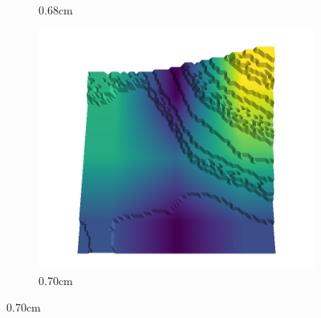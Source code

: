 \begin{figure}[H]
\begin{subfigure}[b]{0.192\linewidth}
    \caption{0.68cm}
    \label{fig : quarry-best-18}
    \end{subfigure}
    \begin{subfigure}[b]{0.192\linewidth}
    \includegraphics[width=\linewidth]{../img/5/quarry/best/70-patch-3d-majavi-colormap-190.png}
    \caption{0.70cm}
    \label{fig : quarry-best-19}
    \end{subfigure}
    \label{fig : quarry-best}
    \end{figure}

